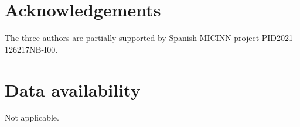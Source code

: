 \documentclass[12pt]{article}
\begin{document}
\section*{Acknowledgements}
The three authors are partially supported by Spanish MICINN
project PID2021-126217NB-I00.


\section*{Data availability}

Not applicable.

% 



\end{document}
